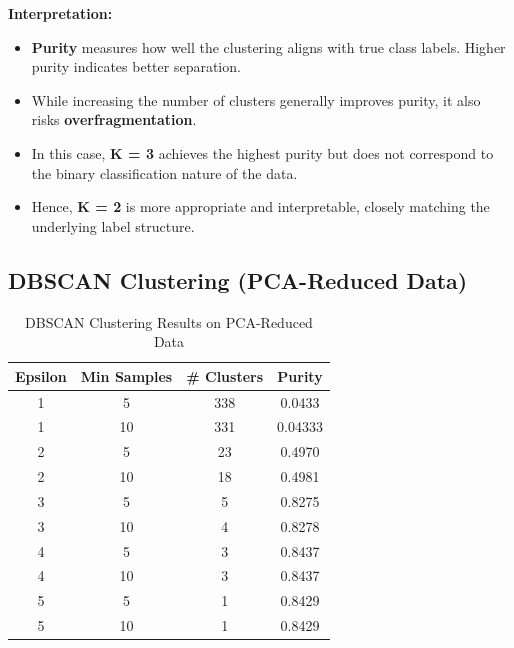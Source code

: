 \documentclass{article}
\begin{document}
\newpage
\textbf{Interpretation:}
\begin{itemize}
    \item \textbf{Purity} measures how well the clustering aligns with true class labels. Higher purity indicates better separation.
    \item While increasing the number of clusters generally improves purity, it also risks \textbf{overfragmentation}.
    \item In this case, \textbf{K = 3} achieves the highest purity but does not correspond to the binary classification nature of the data.
    \item Hence, \textbf{K = 2} is more appropriate and interpretable, closely matching the underlying label structure.
\end{itemize}

\subsection*{DBSCAN Clustering (PCA-Reduced Data)}

\begin{table}[H]
\centering
\caption{DBSCAN Clustering Results on PCA-Reduced Data}
\begin{tabular}{|c|c|c|c|}
\hline
\textbf{Epsilon} & \textbf{Min Samples} & \textbf{\# Clusters} & \textbf{Purity} \\
\hline
1 & 5 & 338 & 0.0433 \\
1 & 10 & 331 & 0.04333 \\
2 & 5 & 23 & 0.4970 \\
2 & 10 & 18 & 0.4981 \\
3 & 5 & 5 & 0.8275 \\
3 & 10 & 4 & 0.8278 \\
4 & 5 & 3 & 0.8437 \\
4 & 10 & 3 & 0.8437 \\
5 & 5 & 1 & 0.8429 \\
5 & 10 & 1 & 0.8429 \\
\hline
\end{tabular}
\end{table}
\end{document}
